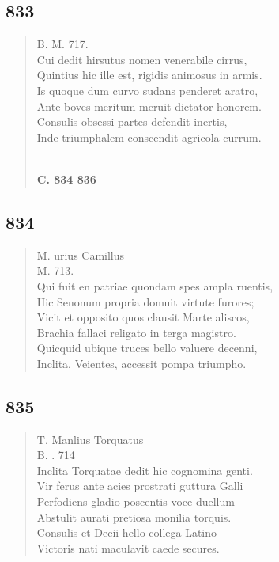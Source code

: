 \documentclass[11pt, a4paper]{report}
\begin{document}
            \subsection*{833}
      \begin{verse}
      B. M. 717. \\ Cui dedit hirsutus nomen venerabile cirrus, \\ Quintius hic ille est, rigidis animosus in armis. \\ Is quoque dum curvo sudans penderet aratro, \\ Ante boves meritum meruit dictator honorem. \\ Consulis obsessi partes defendit inertis, \\ Inde triumphalem conscendit agricola currum. \\ 
        ﻿\pagebreak 
    \begin{center} \textbf{C. 834 836} \end{center} \marginpar{[302]} 
      \end{verse}
  
            \subsection*{834}
      \begin{verse}
      M. urius Camillus \\ M. 713. \\ Qui fuit en patriae quondam spes ampla ruentis, \\ Hic Senonum propria domuit virtute furores; \\ Vicit et opposito quos clausit Marte aliscos, \\ Brachia fallaci religato in terga magistro. \\ Quicquid ubique truces bello valuere decenni, \\ Inclita, Veientes, accessit pompa triumpho. \\ 
      \end{verse}
  
            \subsection*{835}
      \begin{verse}
      T. Manlius Torquatus \\ B. . 714 \\ Inclita Torquatae dedit hic cognomina genti. \\ Vir ferus ante acies prostrati guttura Galli \\ Perfodiens gladio poscentis voce duellum \\ Abstulit aurati pretiosa monilia torquis. \\ Consulis et Decii hello collega Latino \\ Victoris nati maculavit caede secures. \\ 
      \end{verse}
  
\end{document}
